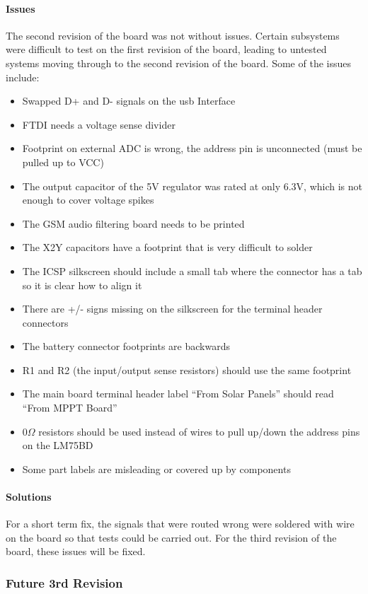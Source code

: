 \documentclass{article}
\numberwithin{figure}{section}
\numberwithin{equation}{section}
\begin{document}
{\paragraph{Issues}
The second revision of the board was not without issues. Certain subsystems were difficult to test on the first revision of the board, leading to untested systems moving through to the second revision of the board. Some of the issues include:
\begin{itemize}
\item Swapped D+ and D- signals on the usb Interface
\item FTDI needs a voltage sense divider
\item Footprint on external ADC is wrong, the address pin is unconnected (must be pulled up to VCC)
\item The output capacitor of the 5V regulator was rated at only 6.3V, which is not enough to cover voltage spikes
\item The GSM audio filtering board needs to be printed
\item The X2Y capacitors have a footprint that is very difficult to solder
\item The ICSP silkscreen should include a small tab where the connector has a tab so it is clear how to align it
\item There are +/- signs missing on the silkscreen for the terminal header connectors
\item The battery connector footprints are backwards
\item R1 and R2 (the input/output sense resistors) should use the same footprint
\item The main board terminal header label ``From Solar Panels'' should read ``From MPPT Board''
\item 0$\Omega$ resistors should be used instead of wires to pull up/down the address pins on the LM75BD
\item Some part labels are misleading or covered up by components
\end{itemize}
\paragraph{Solutions}
For a short term fix, the signals that were routed wrong were soldered with wire on the board so that tests could be carried out. For the third revision of the board, these issues will be fixed.
\subsubsection{Future 3rd Revision}\label{conclusion-pcb-rev3}
}
\end{document}
